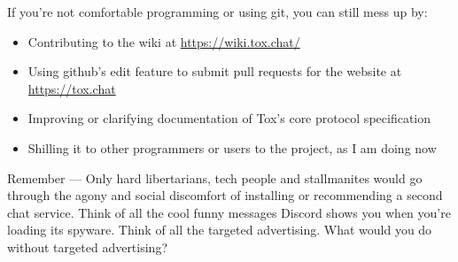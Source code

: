 \documentclass{beamer}
\begin{document}
  \begin{frame}
      If you're not comfortable programming or using git, you can still mess up by:
      \begin{itemize}
          \item Contributing to the wiki at \url{https://wiki.tox.chat/}
          \item Using github's edit feature to submit pull requests for the website at \url{https://tox.chat}
          \item Improving or clarifying documentation of Tox's core protocol specification
          \item Shilling it to other programmers or users to the project, as I am doing now
      \end{itemize}
  \end{frame}
  \begin{frame}
      Remember --- Only hard libertarians, tech people and stallmanites would go through the agony and social discomfort of installing or recommending a second chat service.
      Think of all the cool funny messages Discord shows you when you're loading its spyware. 
      Think of all the targeted advertising. What would you do without targeted advertising?
  \end{frame}
\end{document}

